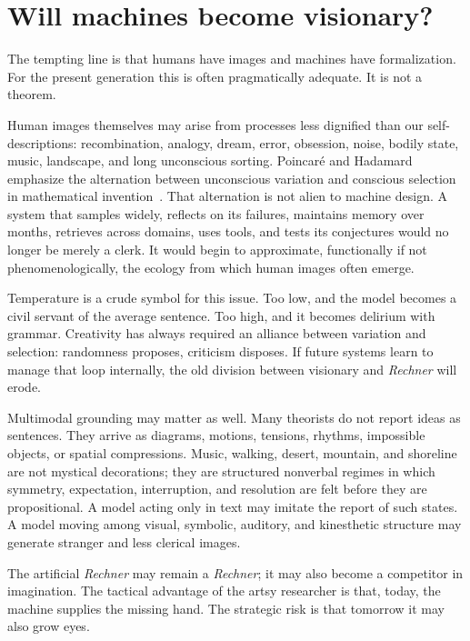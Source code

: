 \documentclass[
  aps,
  reprint,
  superscriptaddress,
  floatfix,
  nofootinbib,
  longbibliography
]{revtex4-2}
\begin{document}
\section{Will machines become visionary?}

The tempting line is that humans have images and machines have formalization. For
the present generation this is often pragmatically adequate. It is not a theorem.

Human images themselves may arise from processes less dignified than our
self-descriptions: recombination, analogy, dream, error, obsession, noise, bodily
state, music, landscape, and long unconscious sorting. Poincar\'e and Hadamard
emphasize the alternation between unconscious variation and conscious selection
in mathematical invention~\cite{poincare1908science,hadamard1945psychology}. That
alternation is not alien to machine design. A system that samples widely,
reflects on its failures, maintains memory over months, retrieves across domains,
uses tools, and tests its conjectures would no longer be merely a clerk. It would
begin to approximate, functionally if not phenomenologically, the ecology from
which human images often emerge.

Temperature is a crude symbol for this issue. Too low, and the model becomes a
civil servant of the average sentence. Too high, and it becomes delirium with
grammar. Creativity has always required an alliance between variation and
selection: randomness proposes, criticism disposes. If future systems learn to
manage that loop internally, the old division between visionary and
\emph{Rechner} will erode.

Multimodal grounding may matter as well. Many theorists do not report ideas as
sentences. They arrive as diagrams, motions, tensions, rhythms, impossible
objects, or spatial compressions. Music, walking, desert, mountain, and shoreline
are not mystical decorations; they are structured nonverbal regimes in which
symmetry, expectation, interruption, and resolution are felt before they are
propositional. A model acting only in text may imitate the report of such states.
A model moving among visual, symbolic, auditory, and kinesthetic structure may
generate stranger and less clerical images.

The artificial \emph{Rechner} may remain a \emph{Rechner}; it may also become a
competitor in imagination. The tactical advantage of the artsy researcher is
that, today, the machine supplies the missing hand. The strategic risk is that
tomorrow it may also grow eyes.
\end{document}
